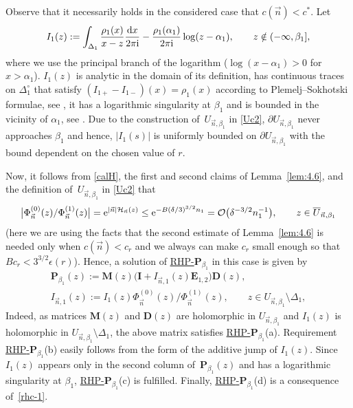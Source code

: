\documentclass[10pt,a4paper]{amsart}
\numberwithin{equation}{section}
\newcommand{\n}{{\vec n}}
\newcommand{\ic}{\mathrm{i}}
\newcommand{\rhp} {\textnormal{RHP}-${\boldsymbol P}$}
\begin{document}
Observe that it necessarily holds in the considered case that $ c(\n) < c^* $. Let
\[
I_1(z) := \int_{\Delta_1}\frac{\rho_1(x)}{x-z}\frac{{\rm d}x}{2\pi\ic} - \frac{\rho_1(\alpha_1)}{2\pi\ic}\log(z-\alpha_1), \qquad z\notin(-\infty,\beta_1],
\]
where we use the principal branch of the logarithm ($\log(x-\alpha_1)>0 $ for $ x>\alpha_1 $). $ I_1(z) $ is analytic in the domain of its definition, has continuous traces on $ \Delta_1^\circ $ that satisfy $ (I_{1+} - I_{1-})(x) = \rho_1(x) $ according to Plemelj--Sokhotski formulae, see \cite[Section~I.4.2]{Gakhov}, it has a logarithmic singularity at $ \beta_1 $ and is bounded in the vicinity of $ \alpha_1 $, see \cite[Section~I.8.2]{Gakhov}. Due to the construction of~$ U_{\n,\beta_1} $ in \eqref{Uc2}, $ \partial U_{\n,\beta_1} $ never approaches $ \beta_1 $ and hence, $ |I_1(s)| $ is uniformly bounded on $ \partial U_{\n,\beta_1} $ with the bound dependent on the chosen value of $ r $.

Now, it follows from \eqref{calH}, the first and second claims of Lemma~\ref{lem:4.6}, and the definition of~$ U_{\n,\beta_1} $ in \eqref{Uc2} that
\begin{equation}
\label{rhc-1}
\big|\Phi_\n^{(0)}(z)/\Phi_\n^{(1)}(z)\big| = {\rm e}^{|\n| \mathcal H_\n(z)} \leq {\rm e}^{-B(\delta/3)^{3/2}n_1} = \mathcal O\bigl( \delta^{-3/2} n_1^{-1}\bigr), \qquad z\in \overline U_{\n,\beta_1}
\end{equation}
(here we are using the facts that the second estimate of Lemma~\ref{lem:4.6} is needed only when $ c(\n) < c_r $ and we always can make $ c_r $ small enough so that $ Bc_r < 3^{3/2}\epsilon(r) $). Hence, a solution of \hyperref[rhp]{\rhp$_{\beta_1}$} in this case is given by
\begin{gather}
\boldsymbol P_{\beta_1}(z) := \boldsymbol M(z) \bigl( \boldsymbol I + I_{\n,1}(z) \boldsymbol E_{1,2} \bigr) \boldsymbol D(z),\nonumber \\
I_{\n,1} (z) := I_1(z)\Phi_\n^{(0)}(z)/\Phi_\n^{(1)}(z),
\qquad z\in U_{\n,\beta_1}\setminus\Delta_1,\label{rhc-2}
\end{gather}
Indeed, as matrices $ \boldsymbol M(z) $ and $ \boldsymbol D(z) $ are holomorphic in $ U_{\n,\beta_1} $ and $ I_1(z) $ is holomorphic in $ U_{\n,\beta_1}\setminus\Delta_1 $, the above matrix satisfies \hyperref[rhp]{\rhp$_{\beta_1}$}(a). Requirement \hyperref[rhp]{\rhp$_{\beta_1}$}(b) easily follows from the form of the additive jump of $ I_1(z) $. Since $ I_1(z) $ appears only in the second column of~$ \boldsymbol P_{\beta_1}(z) $ and has a logarithmic singularity at $ \beta_1 $, \hyperref[rhp]{\rhp$_{\beta_1}$}(c) is fulfilled. Finally, \hyperref[rhp]{\rhp$_{\beta_1}$}(d) is a consequence of~\eqref{rhc-1}.
\end{document}
